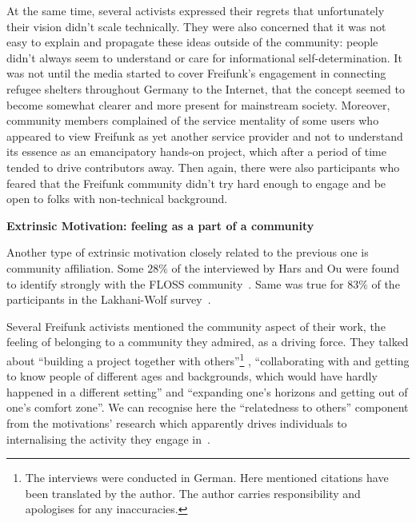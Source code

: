 At the same time, several activists expressed their regrets that unfortunately their vision didn't scale technically.
They were also concerned that it was not easy to explain and propagate these ideas outside of the community: people didn't always seem to understand or care for informational self-determination.
It was not until the media started to cover Freifunk's engagement in connecting refugee shelters throughout Germany to the Internet, that the concept seemed to become somewhat clearer and more present for mainstream society.
Moreover, community members complained of the service mentality of some users who appeared to view Freifunk as yet another service provider and not to understand its essence as an emancipatory hands-on project, which after a period of time tended to drive contributors away.
Then again, there were also participants who feared that the Freifunk community didn't try hard enough to engage and be open to folks with non-technical background.

\textbf{Extrinsic Motivation: feeling as a part of a community}

Another type of extrinsic motivation closely related to the previous one is community affiliation.
Some $28\%$ of the interviewed by Hars and Ou were found to identify strongly with the FLOSS community~\cite{HarOu2002}.
Same was true for $83\%$ of the participants in the Lakhani-Wolf survey~\cite{LakWo2005}.

Several Freifunk activists mentioned the community aspect of their work, the feeling of belonging to a community they admired, as a driving force.
They talked about ``building a project together with others''\footnote{The interviews were conducted in German. Here mentioned citations have been translated by the author. The author carries responsibility and apologises for any inaccuracies.}
, ``collaborating with and getting to know people of different ages and backgrounds, which would have hardly happened in a different setting'' and ``expanding one's horizons and getting out of one's comfort zone''.
We can recognise here the ``relatedness to others'' component from the motivations' research which apparently drives individuals to internalising the activity they engage in~\cite{RyDe2000}.

